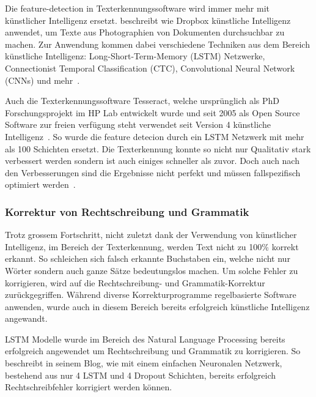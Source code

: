 \documentclass{hwz}
\begin{document}
Die feature-detection in Texterkennungssoftware wird immer mehr mit künstlicher Intelligenz ersetzt. \textcite{Neuberg2017CreatingLearning} beschreibt wie Dropbox künstliche Intelligenz anwendet, um Texte aus Photographien von Dokumenten durchsuchbar zu machen. Zur Anwendung kommen dabei verschiedene Techniken aus dem Bereich künstliche Intelligenz: Long-Short-Term-Memory (LSTM) Netzwerke, Connectionist Temporal Classification (CTC), Convolutional Neural Network (CNNs) und mehr~\autocite{Neuberg2017CreatingLearning}.

Auch die Texterkennungssoftware Tesseract, welche ursprünglich als PhD Forschungsprojekt im HP Lab entwickelt wurde und seit 2005 als Open Source Software zur freien verfügung steht verwendet seit Version 4 künstliche Intelligenz~\autocite{Smith2007AnEngine, o.V.20184.0LSTM}. So wurde die feature detecion durch ein LSTM Netzwerk mit mehr als 100 Schichten ersetzt. Die Texterkennung konnte so nicht nur Qualitativ stark verbessert werden sondern ist auch einiges schneller als zuvor. Doch auch nach den Verbesserungen sind die Ergebnisse nicht perfekt und müssen fallspezifisch optimiert werden~\autocite{o.V.20184.0Performance, o.V.20184.0LSTM}.

\subsubsection{Korrektur von Rechtschreibung und Grammatik}

Trotz grossem Fortschritt, nicht zuletzt dank der Verwendung von künstlicher Intelligenz, im Bereich der Texterkennung, werden Text nicht zu 100\% korrekt erkannt. So schleichen sich falsch erkannte Buchstaben ein, welche nicht nur Wörter sondern auch ganze Sätze bedeutungslos machen. Um solche Fehler zu korrigieren, wird auf die Rechtschreibung- und Grammatik-Korrektur zurückgegriffen. Während diverse Korrekturprogramme regelbasierte Software anwenden, wurde auch in diesem Bereich bereits erfolgreich künstliche Intelligenz angewandt. 

LSTM Modelle wurde im Bereich des Natural Language Processing bereits erfolgreich angewendet um Rechtschreibung und Grammatik zu korrigieren. So beschreibt \textcite{Weiss2016DeepSpelling} in seinem Blog, wie mit einem einfachen Neuronalen Netzwerk, bestehend aus nur 4 LSTM und 4 Dropout Schichten, bereits erfolgreich Rechtschreibfehler korrigiert werden können. 
\end{document}
